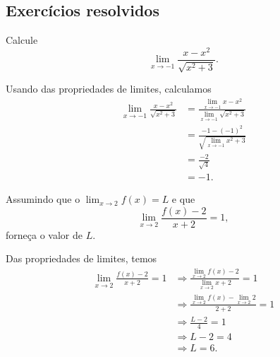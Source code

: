 \subsection*{Exercícios resolvidos}

\begin{exeresol}
  Calcule
  \begin{equation}
    \lim_{x\to -1} \frac{x - x^2}{\sqrt{x^2+3}}.
  \end{equation}
\end{exeresol}
\begin{resol}
  Usando das propriedades de limites, calculamos
  \begin{align}
    \lim_{x\to -1} \frac{x-x^2}{\sqrt{x^2+3}} &= \frac{\lim_{x\to -1} x-x^2}{\lim_{x\to -1} \sqrt{x^2+3}} \\
                                              &= \frac{-1-(-1)^2}{\sqrt{\lim_{x\to -1} x^2+3}} \\
                                              &= \frac{-2}{\sqrt{4}} \\
                                              &= -1.
  \end{align}
\end{resol}

\begin{exeresol}
  Assumindo que o $\lim_{x\to 2} f(x) = L$ e que
  \begin{equation}
    \lim_{x\to 2} \frac{f(x)-2}{x+2} = 1,
  \end{equation}
  forneça o valor de $L$.
\end{exeresol}
\begin{resol}
  Das propriedades de limites, temos
  \begin{align*}
    \lim_{x\to 2} \frac{f(x)-2}{x+2} = 1 &\Rightarrow \frac{\lim_{x\to 2} f(x)-2}{\lim_{x\to 2} x+2} = 1\\
                                         &\Rightarrow \frac{\lim_{x\to 2} f(x) - \lim_{x\to 2} 2}{2+2} = 1\\
                                         &\Rightarrow \frac{L-2}{4} = 1\\
                                         &\Rightarrow L-2 = 4\\
                                         &\Rightarrow L = 6.
  \end{align*}
\end{resol}


